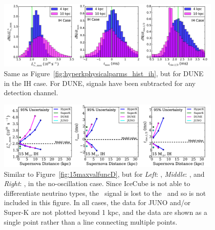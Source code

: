 \begin{figure}[h]
\centerline{\includegraphics[width=\linewidth]{wh07_15_40g_DUNE_realparameters_histogram_oscillations_backgrounds_IH.pdf}}
\caption{\label{fig:dunephysicalparms_hist_ih} Same as
  Figure~\ref{fig:hyperkphysicalparms_hist_ih}, but for DUNE in the
  IH case.  For DUNE, signals have been subtracted for any detection channel.}
\end{figure}


\clearpage


\begin{figure}[h]
\centerline{\includegraphics[width=\linewidth]{wh07_15_40g_groupnumber_0_95_funcdistance_backgrounds_oscillations_IH.pdf}}
\caption{\label{fig:15funcD_IH} Similar to
  Figure~\ref{fig:15maxvalfuncD}, but for {\it Left}: \lmax, {\it
    Middle}: \tmax, and {\it
    Right}: \trise, in the no-oscillation case.
  Since IceCube is not able to differentiate neutrino
  types, the \nue\ signal is lost to the \backgrounds\ and so is not
  included in this figure.  
  In all cases, the data for JUNO and/or Super-K are not
  plotted beyond 1 kpc, and the data are shown
  as a single point rather than a line connecting multiple points.
}
\end{figure}


\setcounter{figure}{0}
\renewcommand{\thefigure}{A\arabic{figure}}

